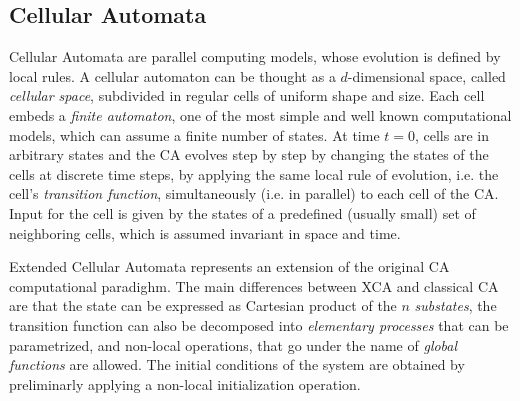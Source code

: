 \subsection{Cellular Automata}\label{sec:CA}
    Cellular Automata are parallel computing models, whose evolution
    is defined by local rules. A cellular automaton can be thought as
    a $d$-dimensional space, called \emph{cellular space}, subdivided
    in regular cells of uniform shape and size. Each cell embeds a
    \emph{finite automaton}, one of the most simple and well known
    computational models, which can assume a finite number of
    states. At time $t=0$, cells are in arbitrary states and the CA
    evolves step by step by changing the states of the cells at
    discrete time steps, by applying the same local rule of evolution,
    i.e. the cell's \emph{transition function}, simultaneously
    (i.e. in parallel) to each cell of the CA. Input for the cell is
    given by the states of a predefined (usually small) set of
    neighboring cells, which is assumed invariant in space and time.
 
 Extended Cellular Automata\cite{DiGregorio&Serra-1999}  represents an extension of the original CA computational paradighm.   
    The main differences between XCA and classical CA are that the state can be expressed as Cartesian product of the $n$ 
    \emph{substates}, the transition function can also be decomposed into \textit{elementary processes} that can be parametrized,
    and non-local operations, that go under the name of \textit{global functions} are allowed.
        The initial conditions of the system are obtained by preliminarly
    applying a non-local initialization operation.
    



